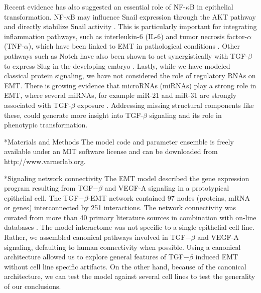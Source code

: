 \documentclass[12pt]{article}
\makeatletter
\renewcommand\subsection{\@startsection
	{subsection}{2}{0mm}
	{-0.05in}
	{-0.5\baselineskip}
	{\normalfont\normalsize\bfseries}}
\renewcommand\section{\@startsection
	{subsection}{2}{0mm}
	{-0.2in}
	{0.05\baselineskip}
	{\normalfont\large\bfseries}}
\makeatother
\begin{document}
Recent evidence has also suggested an essential role of NF-$\kappa$B in epithelial transformation.  NF-$\kappa$B may influence Snail expression through the AKT pathway and directly stabilize Snail activity \citep{Wu:2009cr}.  This is particularly important for integrating inflammation pathways, such as interleukin-6 (IL-6) and tumor necrosis factor-$\alpha$ (TNF-$\alpha$), which have been linked to EMT in pathological conditions \citep{Sullivan:2009bh}.
Other pathways such as Notch have also been shown to act synergistically with TGF-$\beta$ to express Slug in the developing embryo \citep{Niessen:2008nx}.
Lastly, while we have modeled classical protein signaling, we have not considered the role of regulatory RNAs on EMT.
There is growing evidence that microRNAs (miRNAs) play a strong role in EMT, where several miRNAs, for example miR-21 and miR-31 are strongly associated with TGF-$\beta$ exposure \citep{Bullock:2012aa}.
Addressing missing structural components like these, could generate more insight into TGF-$\beta$ signaling and its role in phenotypic transformation.

\clearpage

\section*{Materials and Methods}
The model code and parameter ensemble is freely available under an MIT software license and can be downloaded from http://www.varnerlab.org.

\subsection*{Signaling network connectivity}
The EMT model described the gene expression program resulting from TGF$-\beta$ and VEGF-A signaling in a prototypical epithelial cell.
The TGF$-\beta$-EMT network contained 97 nodes (proteins, mRNA or genes) interconnected by 251 interactions.
The network connectivity was curated from more than 40 primary literature sources in combination with on-line databases \citep{Linding:2007fk,Jensen:2009fk}.
The model interactome was not specific to a single epithelial cell line.
Rather, we assembled canonical pathways involved in TGF$-\beta$ and VEGF-A signaling, defaulting to human connectivity when possible.
Using a canonical architecture allowed us to explore general features of TGF$-\beta$ induced EMT without cell line specific artifacts.
On the other hand, because of the canonical architecture, we can test the model against several cell lines to test the generality of our conclusions.
\end{document}
